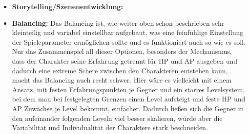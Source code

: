 \begin{itemize}
    \item \textbf{Storytelling/Szenenentwicklung:}  

    \item \textbf{Balancing:} Das Balancing ist, wie weiter oben schon beschrieben sehr kleinteilig und variabel einstellbar aufgebaut, was eine feinfühlige Einstellung der Spieleparameter ermöglichen sollte und es funktioniert auch so wie es soll. Nur das Zusammenspiel all dieser Optionen, besonders der Mechanismus, dass der Charakter seine Erfahrung getrennt für HP und AP ausgeben und dadurch eine extreme Schere zwischen den Charakteren entstehen kann, macht das Balancing auch recht schwer. Hier wäre es vielleicht mit einem Ansatz, mit festen Erfahrungspunkten je Gegner und ein starres Levelsystem, bei dem man bei festgelegten Grenzen einen Level aufsteigt und feste HP und AP Zuwächse je Level bekommt, einfacher. Dadurch ließen sich die Gegner in den aufeinander folgenden Leveln viel besser skalieren, würde aber die Variabilität und Individualität der Charaktere stark beschneiden.

\end{itemize}

